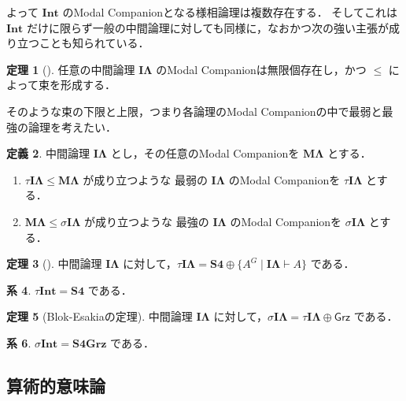 \documentclass{jsarticle}
\newcommand*{\Ax}[1]{\mathsf{#1}}
\newcommand*{\AxGrz}{\Ax{Grz}}
\newcommand*{\Logic}[1]{\mathbf{#1}}
\newcommand*{\LogicSFour}{\Logic{S4}}
\newcommand*{\LogicSFourGrz}{\Logic{S4Grz}}
\newcommand*{\LogicInt}{\Logic{Int}}
\theoremstyle{definition}
\newtheorem{theorem}{定理}[section]
\newtheorem{definition}[theorem]{定義}
\newtheorem{corollary}[theorem]{系}
\begin{document}
よって $\LogicInt$ のModal Companionとなる様相論理は複数存在する．
そしてこれは $\LogicInt$ だけに限らず一般の中間論理に対しても同様に，なおかつ次の強い主張が成り立つことも知られている．

\begin{theorem}[\cite*{maksimova_lattice_1974}]
	任意の中間論理 $\Logic{I\Lambda}$ のModal Companionは無限個存在し，かつ $\leq$ によって束を形成する．
\end{theorem}

そのような束の下限と上限，つまり各論理のModal Companionの中で最弱と最強の論理を考えたい．

\begin{definition}
	中間論理 $\Logic{I\Lambda}$ とし，その任意のModal Companionを $\Logic{M\Lambda}$ とする．

	\begin{enumerate}
		\item
		      $\tau\Logic{I\Lambda} \leq \Logic{M\Lambda}$ が成り立つような
		      最弱の $\Logic{I\Lambda}$ のModal Companionを $\tau\Logic{I\Lambda}$ とする．
		\item
		      $\Logic{M\Lambda} \leq \sigma\Logic{I\Lambda}$ が成り立つような
		      最強の $\Logic{I\Lambda}$ のModal Companionを $\sigma\Logic{I\Lambda}$ とする．
	\end{enumerate}
\end{definition}

\begin{theorem}[\cite*{dummett_modal_1959}]
	中間論理 $\Logic{I\Lambda}$ に対して，$\tau \Logic{I\Lambda} = \LogicSFour \oplus \{ A^G \mid \Logic{I\Lambda} \vdash A \} $ である．
\end{theorem}

\begin{corollary}
	$\tau \LogicInt = \LogicSFour$ である．
\end{corollary}

\begin{theorem}[Blok-Esakiaの定理\cite*{blok_varieties_1976,esakia_theory_1979,esakia_varieties_1979}]
	中間論理 $\Logic{I\Lambda}$ に対して，$\sigma \Logic{I\Lambda} = \tau\Logic{I\Lambda} \oplus \AxGrz$ である．
\end{theorem}

\begin{corollary}
	$\sigma \LogicInt = \LogicSFourGrz$ である．
\end{corollary}


\subsection{算術的意味論}
\end{document}
